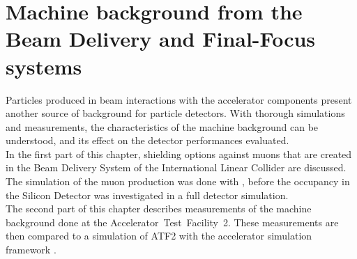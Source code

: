 \chapter{Machine background from the Beam Delivery and Final-Focus systems}

\begin{chapterabstract}
 Particles produced in beam interactions with the accelerator components present another source of background for particle detectors.
 With thorough simulations and measurements,  the characteristics of the machine background can be understood, and its effect on the detector performances evaluated.
 \\In the first part of this chapter, shielding options against muons that are created in the Beam Delivery System of the International Linear Collider are discussed.
 The simulation of the muon production was done with \mucarlo, before the occupancy in the Silicon Detector was investigated in a full detector simulation.
 \\The second part of this chapter describes measurements of the machine background done at the \mbox{Accelerator Test Facility 2}.
 These measurements are then compared to a simulation of ATF2 with the accelerator simulation framework \bdsim.
\end{chapterabstract}

